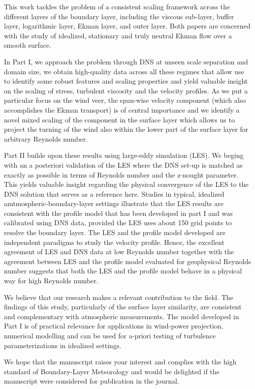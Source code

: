 \documentclass[brief]{fub}
\begin{document}
%
This work tackles the problem of a consistent scaling framework across the different layers of the boundary layer,
including the viscous sub-layer, buffer layer, logarithmic layer, Ekman layer, and outer layer. Both papers 
are concerned with the study of idealized, stationary and truly neutral Ekman flow over a smooth surface. 
%
\par
%
In Part I, we approach the problem through DNS at unseen scale separation and domain size, we obtain high-quality data across all
these regimes that allow use to identify some robust features and scaling properties and yield valuable insight
on the scaling of stress, turbulent viscosity and the velocity profiles.
%
As we put a particular focus on the wind veer, the span-wise velocity component (which also accomplishes the Ekman transport)
is of central importance and we identify a novel mixed scaling of the component in the surface layer which allows us
to project the turning of the wind also within the lower part of the surface layer for arbitrary Reynolds number.
% 
\par
%
Part II builds upon these results using large-eddy simulation (LES). We beging with an a posteriori validation of the LES where
the DNS set-up is matched as exactly as possible in terms of Reynolds number and the z-nought parameter.
This yields valuable insight regarding the physical convergence of the LES to the DNS solution that serves as a reference here. 
%
Studies in typical, idealized amtmospheric-boundary-layer settings illustrate that the LES results are consistent with
the profile model that has been developed in part I and was calibrated using DNS data, provided the LES uses about 150 grid points to resolve the boundary layer.
%
The LES and the profile model developed are independent paradigms to study the velocity profile. Hence, the excellent agreement of LES and DNS data at low Reynolds number together with the agreement between LES and the profile model evaluated for geophysical Reynolds number suggests that both the LES and the profile model behave in a physical way for high Reynolds number. 
%
\par
%
We believe that our research makes a relevant contribution to the field.
%
The findings of this study, particularly of the surface layer similarity, are consistent and
complementary with atmospheric measurements.
%
The model developed in Part I is of practical relevance for applications in wind-power projection, numerical modelling
and can be used for a-priori testing of turbulence parameterizations in idealized settings. 
%
\par
%
We hope that the manuscript raises your interest and complies with the high standard of Boun\-da\-ry-Layer Meteorology and  would be delighted if the manuscript were considered for publication in the journal.
\end{document}
